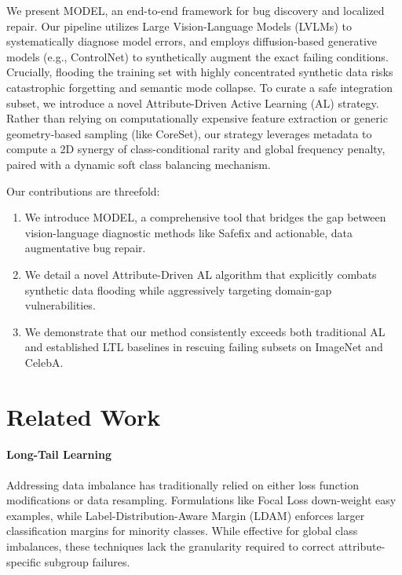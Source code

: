 \documentclass{article}
\newcommand{\model}{MODEL\xspace}
\newcommand{\hibug}{Safefix\xspace}
\newcommand{\controlnet}{ControlNet\xspace}
\begin{document}
We present \model, an end-to-end framework for bug discovery and localized repair. Our pipeline utilizes Large Vision-Language Models (LVLMs) \citep{bai2025qwen25vl,liu2023improvedllava} to systematically diagnose model errors, and employs diffusion-based generative models (e.g., \controlnet) to synthetically augment the exact failing conditions. Crucially, flooding the training set with highly concentrated synthetic data risks catastrophic forgetting and semantic mode collapse. To curate a safe integration subset, we introduce a novel Attribute-Driven Active Learning (AL) strategy. Rather than relying on computationally expensive feature extraction or generic geometry-based sampling (like CoreSet), our strategy leverages metadata to compute a 2D synergy of class-conditional rarity and global frequency penalty, paired with a dynamic soft class balancing mechanism.

Our contributions are threefold:
\begin{enumerate}
    \item We introduce \model, a comprehensive tool that bridges the gap between vision-language diagnostic methods like \hibug \citep{chen2023hibug} and actionable, data augmentative bug repair.
    \item We detail a novel Attribute-Driven AL algorithm that explicitly combats synthetic data flooding while aggressively targeting domain-gap vulnerabilities.
    \item We demonstrate that our method consistently exceeds both traditional AL and established LTL baselines in rescuing failing subsets on ImageNet and CelebA.
\end{enumerate}


\section{Related Work}

\paragraph{Long-Tail Learning} Addressing data imbalance has traditionally relied on either loss function modifications or data resampling. Formulations like Focal Loss \citep{lin2017focal} down-weight easy examples, while Label-Distribution-Aware Margin (LDAM) \citep{cao2019learning} enforces larger classification margins for minority classes. While effective for global class imbalances, these techniques lack the granularity required to correct attribute-specific subgroup failures.
\end{document}
